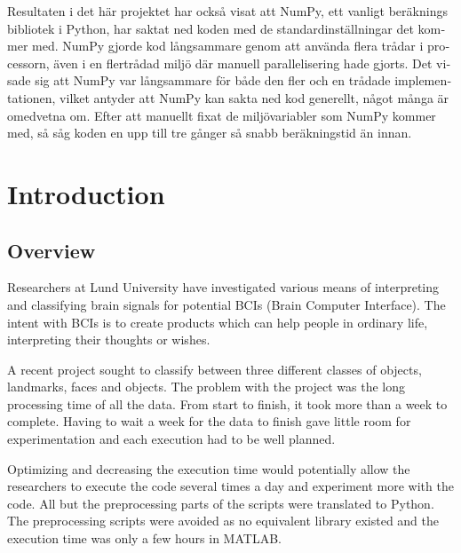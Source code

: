 \documentclass[12pt, a4paper]{article}
\begin{document}
\begin{otherlanguage}{swedish}
Resultaten i det här projektet har också visat att NumPy, ett vanligt beräknings bibliotek i Python, har saktat ned koden med de standardinställningar det kommer med.
NumPy gjorde kod långsammare genom att använda flera trådar i processorn, även i en flertrådad miljö där manuell parallelisering hade gjorts.
Det visade sig att NumPy var långsammare för både den fler och en trådade implementationen, vilket antyder att NumPy kan sakta ned kod generellt, något många är omedvetna om.
Efter att manuellt fixat de miljövariabler som NumPy kommer med, så såg koden en upp till tre gånger så snabb beräkningstid än innan.

\end{otherlanguage}

\tableofcontents


\glsaddall
\renewcommand*{\arraystretch}{1.1}
\printglossary[type=main,style=long,nonumberlist]

\newpage

\section{Introduction}

\subsection{Overview}

Researchers at Lund University have investigated various means of interpreting and classifying brain signals for potential BCIs (Brain Computer Interface). 
The intent with BCIs is to create products which can help people in ordinary life, interpreting their thoughts or wishes.

A recent project sought to classify between three different classes of objects, landmarks, faces and objects.
The problem with the project was the long processing time of all the data.
From start to finish, it took more than a week to complete.
Having to wait a week for the data to finish gave little room for experimentation and each execution had to be well planned.

Optimizing and decreasing the execution time would potentially allow the researchers to execute the code several times a day and experiment more with the code.
All but the preprocessing parts of the scripts were translated to Python.
The preprocessing scripts were avoided as no equivalent library existed and the execution time was only a few hours in MATLAB.
\end{document}
